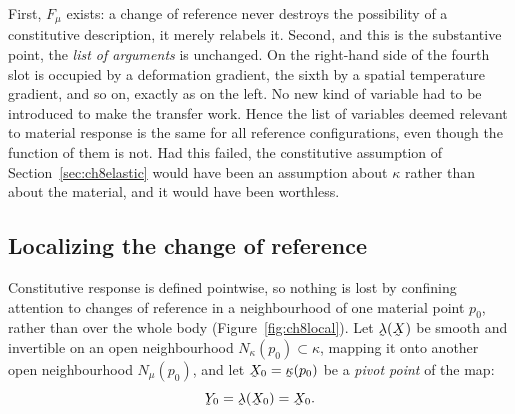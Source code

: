 First, $F_{\mu}$ exists: a change of reference never destroys the
possibility of a constitutive description, it merely relabels it.
Second, and this is the substantive point, the \emph{list of arguments}
is unchanged. On the right-hand side of  the fourth slot is
occupied by a deformation gradient, the sixth by a spatial temperature
gradient, and so on, exactly as on the left. No new kind of variable had
to be introduced to make the transfer work. Hence the list of variables
deemed relevant to material response is the same for all reference
configurations, even though the function of them is not. Had this failed,
the constitutive assumption of Section~\ref{sec:ch8elastic} would have
been an assumption about $\kappa$ rather than about the material, and it
would have been worthless.

\subsection*{Localizing the change of reference}

Constitutive response is defined pointwise, so nothing is lost by
confining attention to changes of reference in a neighbourhood of one
material point $p_{0}$, rather than over the whole body
(Figure~\ref{fig:ch8local}). Let $\vek{\lambda}(\bX)$ be smooth and
invertible on an open neighbourhood $N_{\kappa}(p_{0})\subset\kappa$,
mapping it onto another open neighbourhood $N_{\mu}(p_{0})$, and let
$\bX_{0}=\bkappa(p_{0})$ be a \emph{pivot point} of the map:
\[
   \bY_{0}=\vek{\lambda}(\bX_{0})=\bX_{0}.
\]

